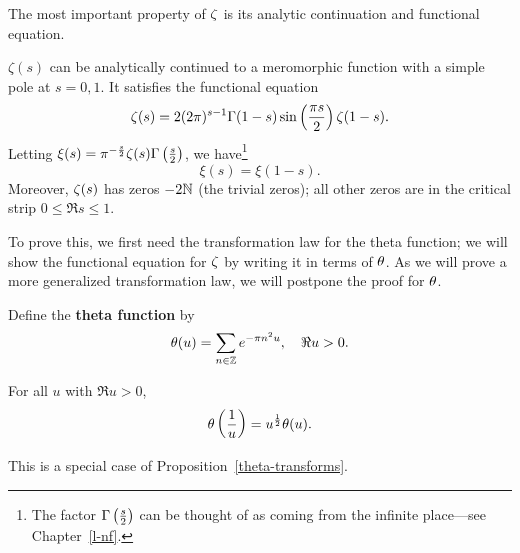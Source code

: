 The most important property of $\zeta$ is its analytic continuation and functional equation.
\begin{thm}
$\zeta(s)$ can be analytically continued to a meromorphic function with a simple pole at $s=0,1$. %
It satisfies the functional equation
\[
\zeta(s)=2(2\pi)^{s-1}\Gamma(1-s)\sin\left( {\frac{\pi s}{2}} \right) \zeta(1-s).
\]
Letting $\xi(s)=\pi^{-\frac s2}\zeta(s)\Gamma\left( {\frac{s}{2}} \right)$, we have\footnote{The factor $\Gamma\left( {\frac{s}{2}} \right)$ can be thought of as coming from the infinite place---see Chapter~\ref{l-nf}.}
\[
\xi(s)=\xi(1-s).
\]
Moreover, $\zeta(s)$ has zeros $-2\mathbb{N}$ (the trivial zeros); all other zeros are in the critical strip $0\le \Re s\le 1$.
\end{thm}
To prove this, we first need the transformation law for the theta function; we will show the functional equation for $\zeta$ by writing it in terms of $\theta$. As we will prove a more generalized transformation law, we will postpone the proof for $\theta$.
\begin{df}
Define the \textbf{theta function} by
\[
\theta(u)=\sum_{n\in \mathbb{Z}}e^{-\pi n^2u},\quad \Re u>0.
\]
\end{df}
\begin{pr}
For all $u$ with $\Re u>0$,
\[
\theta\left( {\frac{1}{u}} \right) = u^{\frac{1}{2}} \theta(u).
\]
\end{pr}
This is a special case of Proposition~\ref{theta-transforms}.
